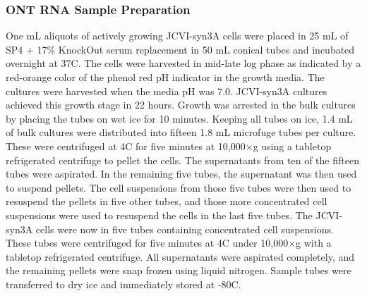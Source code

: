 \subsubsection{ONT RNA Sample Preparation}

One mL aliquots of actively growing JCVI-syn3A cells were placed in 25 mL of SP4 + 17\% KnockOut serum replacement in 50 mL conical tubes and incubated overnight at 37\textdegree C.
The cells were harvested in mid-late log phase as indicated by a red-orange color of the phenol red pH indicator in the growth media.
The cultures were harvested when the media pH was 7.0.
JCVI-syn3A cultures achieved this growth stage in 22 hours.
Growth was arrested in the bulk cultures by placing the tubes on wet ice for 10 minutes.
Keeping all tubes on ice, 1.4 mL of bulk cultures were distributed into fifteen 1.8 mL microfuge tubes per culture.
These were centrifuged at 4\textdegree C for five minutes at 10,000$\times$g using a tabletop refrigerated centrifuge to pellet the cells.
The supernatants from ten of the fifteen tubes were aspirated.
In the remaining five tubes, the supernatant was then used to suspend pellets.
The cell suspensions from those five tubes were then used to resuspend the pellets in five other tubes, and those more concentrated cell suspensions were used to resuspend the cells in the last five tubes.
The JCVI-syn3A cells were now in five tubes containing concentrated cell suspensions.
These tubes were centrifuged for five minutes at 4\textdegree C under 10,000$\times$g with a tabletop refrigerated centrifuge.
All supernatants were aspirated completely, and the remaining pellets were snap frozen using liquid nitrogen.
Sample tubes were transferred to dry ice and immediately stored at -80\textdegree C.

